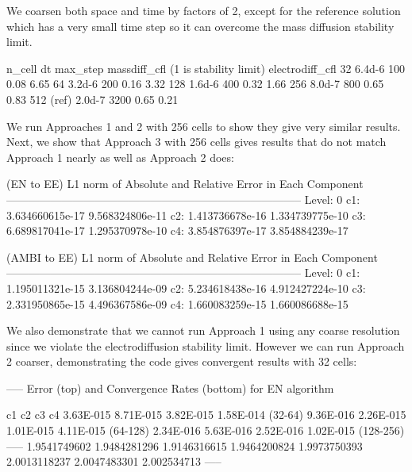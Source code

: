 \documentclass[final]{siamltex}
\begin{document}
We coarsen both space and time by factors of 2, except for the reference solution which has
a very small time step so it can overcome the mass diffusion stability limit.

n\_cell       dt       max\_step   massdiff\_cfl (1 is stability limit)  electrodiff\_cfl
32           6.4d-6   100        0.08                                 6.65
64           3.2d-6   200        0.16                                 3.32
128          1.6d-6   400        0.32                                 1.66
256          8.0d-7   800        0.65                                 0.83
512 (ref)    2.0d-7   3200       0.65                                 0.21

We run Approaches 1 and 2 with 256 cells to show they give very similar results.
Next, we show that Approach 3 with 256 cells gives results that do not match
Approach 1 nearly as well as Approach 2 does:

(EN to EE) L1 norm of Absolute and Relative Error in Each Component
--------------------------------------------------------------------------------
Level:  0
                                c1:      3.634660615e-17     9.568324806e-11
                                c2:      1.413736678e-16     1.334739775e-10
                                c3:      6.689817041e-17     1.295370978e-10
                                c4:      3.854876397e-17     3.854884239e-17

(AMBI to EE) L1 norm of Absolute and Relative Error in Each Component
--------------------------------------------------------------------------------
Level:  0
                                c1:      1.195011321e-15     3.136804244e-09
                                c2:      5.234618438e-16     4.912427224e-10
                                c3:      2.331950865e-15     4.496367586e-09
                                c4:      1.660083259e-15     1.660086688e-15

We also demonstrate that we cannot run Approach 1 using any coarse resolution
since we violate the electrodiffusion stability limit.  However we can run
Approach 2 coarser, demonstrating the code gives convergent results with 32 cells:

-----
Error (top) and Convergence Rates (bottom) for EN algorithm

c1		c2		c3		c4
3.63E-015	8.71E-015	3.82E-015	1.58E-014  (32-64)
9.36E-016	2.26E-015	1.01E-015	4.11E-015  (64-128)
2.34E-016	5.63E-016	2.52E-016	1.02E-015  (128-256)
-----
1.9541749602	1.9484281296	1.9146316615	1.9464200824
1.9973750393	2.0013118237	2.0047483301	2.002534713
-----
\end{document}
